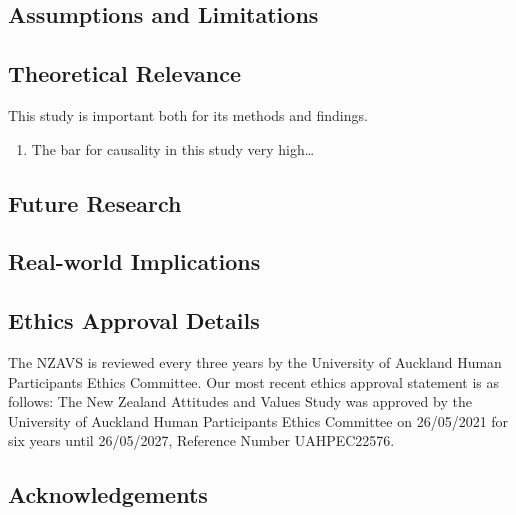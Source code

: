 \documentclass[
  singlecolumn]{report}
\providecommand{\tightlist}{%
  \setlength{\itemsep}{0pt}\setlength{\parskip}{0pt}}\usepackage{longtable,booktabs,array}
\begin{document}
\hypertarget{assumptions-and-limitations}{%
\subsection{Assumptions and
Limitations}\label{assumptions-and-limitations}}

\hypertarget{theoretical-relevance}{%
\subsection{Theoretical Relevance}\label{theoretical-relevance}}

This study is important both for its methods and findings.

\begin{enumerate}
\def\labelenumi{\arabic{enumi}.}
\tightlist
\item
  The bar for causality in this study very high\ldots{}
\end{enumerate}

\hypertarget{future-research}{%
\subsection{Future Research}\label{future-research}}

\hypertarget{real-world-implications}{%
\subsection{Real-world Implications}\label{real-world-implications}}

\hypertarget{ethics-approval-details}{%
\subsection{Ethics Approval Details}\label{ethics-approval-details}}

The NZAVS is reviewed every three years by the University of Auckland
Human Participants Ethics Committee. Our most recent ethics approval
statement is as follows: The New Zealand Attitudes and Values Study was
approved by the University of Auckland Human Participants Ethics
Committee on 26/05/2021 for six years until 26/05/2027, Reference Number
UAHPEC22576.

\hypertarget{acknowledgements}{%
\subsection{Acknowledgements}\label{acknowledgements}}
\end{document}
